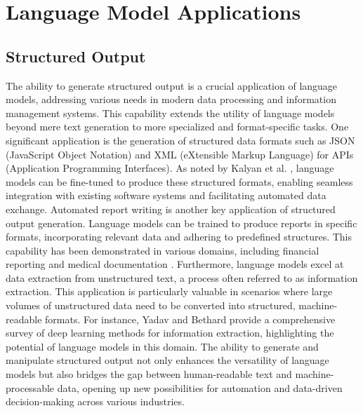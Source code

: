 \documentclass[a4paper, oneside]{discothesis}
\begin{document}
\section{Language Model Applications}

\subsection{Structured Output}
The ability to generate structured output is a crucial application of language models, addressing various needs in modern data processing and information management systems. This capability extends the utility of language models beyond mere text generation to more specialized and format-specific tasks.
One significant application is the generation of structured data formats such as JSON (JavaScript Object Notation) and XML (eXtensible Markup Language) for APIs (Application Programming Interfaces). As noted by Kalyan et al. \cite{kalyan2021ammus}, language models can be fine-tuned to produce these structured formats, enabling seamless integration with existing software systems and facilitating automated data exchange.
Automated report writing is another key application of structured output generation. Language models can be trained to produce reports in specific formats, incorporating relevant data and adhering to predefined structures. This capability has been demonstrated in various domains, including financial reporting \cite{muralidhar2021using} and medical documentation \cite{zhang2022generating}.
Furthermore, language models excel at data extraction from unstructured text, a process often referred to as information extraction. This application is particularly valuable in scenarios where large volumes of unstructured data need to be converted into structured, machine-readable formats. For instance, Yadav and Bethard \cite{yadav2018survey} provide a comprehensive survey of deep learning methods for information extraction, highlighting the potential of language models in this domain.
The ability to generate and manipulate structured output not only enhances the versatility of language models but also bridges the gap between human-readable text and machine-processable data, opening up new possibilities for automation and data-driven decision-making across various industries.
\end{document}
